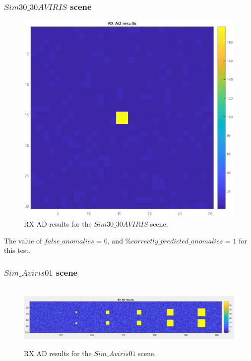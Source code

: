 \subsubsection{$Sim30\_30AVIRIS$ scene }
\begin{figure}[H]
\centering
   \includegraphics[scale=0.4]{images/AD_testing/synthetic_images/rx_ad_30_30.png}
  \caption{ RX AD results for the $Sim30\_30AVIRIS$ scene.} 
  \label{fig:rx_sim_aviris_30_30}
\end{figure}

The value of $false\_anomalies$ = 0, and  $\%correctly\_predicted\_anomalies$ = $1$ for this test.


\subsubsection{$Sim\_Aviris01$ scene }
\begin{figure}[H]
\hbox{\hspace*{-1cm}                                              
   \includegraphics[scale=0.4]{images/AD_testing/synthetic_images/rx_ad_614_100.png}}
  \caption{ RX AD results for the $Sim\_Aviris01$ scene.} 
  \label{fig:rx_sim_aviris_01}
\end{figure}

